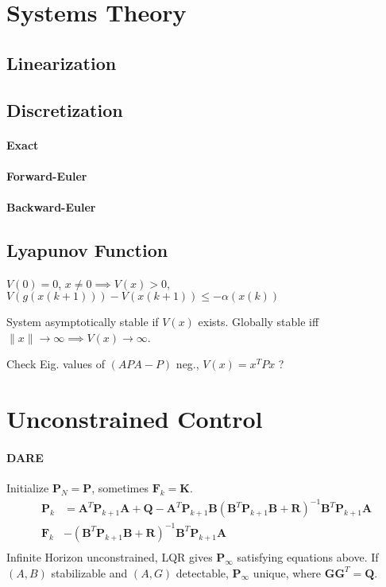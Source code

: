 \documentclass[landscape,a4paper,8pt]{scrartcl}
\newcommand\vA{\bm{A}}
\newcommand\vB{\bm{B}}
\newcommand\vF{\bm{F}}
\newcommand\vG{\bm{G}}
\newcommand\vK{\bm{K}}
\newcommand\vP{\bm{P}}
\newcommand\vQ{\bm{Q}}
\newcommand\vR{\bm{R}}
\begin{document}

\begin{multicols*}{3}
\section{Systems Theory}
\subsection{Linearization}
\subsection{Discretization}
\paragraph{Exact}
\paragraph{Forward-Euler}
\paragraph{Backward-Euler}
\subsection{Lyapunov Function}
$V(0) = 0$, $x \neq 0 \implies V(x) > 0$, $V(g(x(k+1))) - V(x(k+1)) \leq - \alpha(x(k))$

System asymptotically stable if $V(x)$ exists.
Globally stable iff $\lVert x \rVert \rightarrow \infty \implies V(x) \rightarrow \infty$.

Check Eig. values of $(APA-P)$ neg., $V(x) = x^TPx$ ?

\section{Unconstrained Control}

\paragraph{DARE}
Initialize $\vP_{N} = \vP$,
sometimes $\vF_k = \vK$.
\begin{align*}
 \vP_k & = \vA^T\vP_{k+1}\vA + \vQ - \vA^T\vP_{k+1}\vB(\vB^T\vP_{k+1}\vB + \vR)^{-1}\vB^T\vP_{k+1}\vA \\
 \vF_k & -(\vB^T\vP_{k+1}\vB + \vR)^{-1}\vB^T\vP_{k+1}\vA \\
\end{align*}
Infinite Horizon unconstrained, LQR gives $\vP_\infty$ satisfying equations above.
If $(A,B)$ stabilizable and $(A, G)$ detectable, $\vP_\infty$ unique, where $\vG\vG^T = \vQ$.


\end{multicols*}
\end{document}
